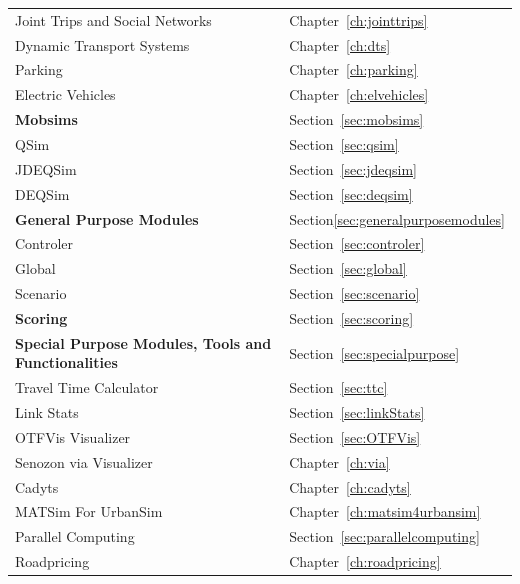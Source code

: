 \begin{table}
\begin{longtable}[c]{|l|l|}
	Joint Trips and Social Networks & Chapter~\ref{ch:jointtrips} \\
	Dynamic Transport Systems & Chapter~\ref{ch:dts} \\
	Parking & Chapter~\ref{ch:parking} \\
	Electric Vehicles & Chapter~\ref{ch:elvehicles} \\
	\hline
	\hline
	\textbf{Mobsims} & Section~\ref{sec:mobsims} \\
	\hline
	QSim & Section~\ref{sec:qsim} \\
	JDEQSim & Section~\ref{sec:jdeqsim} \\
	DEQSim & Section~\ref{sec:deqsim} \\
	\hline
%
	\hline
	\textbf{General Purpose Modules} & Section\ref{sec:generalpurposemodules} \\
	\hline
	Controler & Section~\ref{sec:controler} \\
	Global & Section~\ref{sec:global} \\
	Scenario & Section~\ref{sec:scenario} \\
	\hline
	\hline
	\textbf{Scoring} & Section~\ref{sec:scoring} \\
	\hline
	\hline
	\textbf{Special Purpose Modules, Tools and Functionalities} & Section~\ref{sec:specialpurpose} \\
	\hline
	Travel Time Calculator & Section~\ref{sec:ttc} \\
	Link Stats & Section~\ref{sec:linkStats} \\
	OTFVis Visualizer & Section~\ref{sec:OTFVis} \\
	Senozon via Visualizer & Chapter~\ref{ch:via} \\
	Cadyts & Chapter~\ref{ch:cadyts} \\
	MATSim For UrbanSim & Chapter~\ref{ch:matsim4urbansim} \\
	Parallel Computing & Section~\ref{sec:parallelcomputing} \\
	Roadpricing & Chapter~\ref{ch:roadpricing} \\

\end{longtable}
\end{table}
